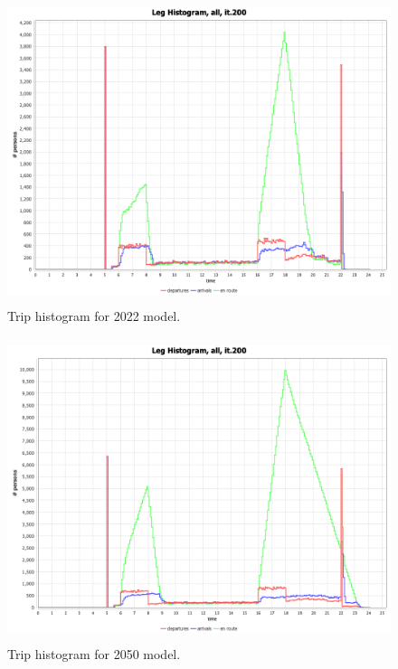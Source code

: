 \documentclass[
  letterpaper,
  DIV=11,
  numbers=noendperiod]{scrartcl}
\begin{document}
\begin{figure}

{\centering \includegraphics[width=\textwidth,height=3.5in]{figures/matsim/200.legHistogram_all2022.png}

}

\caption{\label{fig-hist-2022}Trip histogram for 2022 model.}

\end{figure}

\begin{figure}

{\centering \includegraphics[width=\textwidth,height=3.5in]{figures/matsim/200.legHistogram_all2050.png}

}

\caption{\label{fig-2050-hist}Trip histogram for 2050 model.}

\end{figure}
\end{document}

